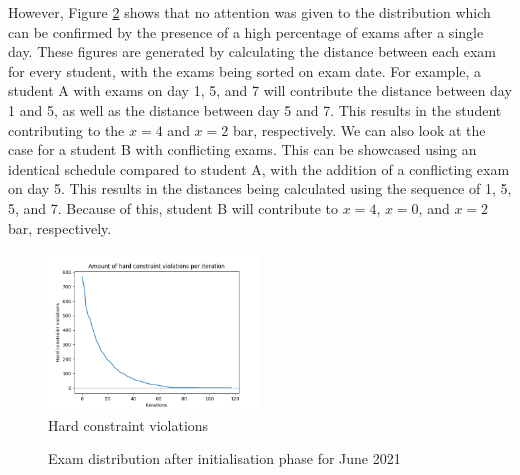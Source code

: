 However, Figure \ref{fig:init} shows that no attention was given to the distribution which can be confirmed by the presence of a high percentage of exams after a single day. These figures are generated by calculating the distance between each exam for every student, with the exams being sorted on exam date. For example, a student A with exams on day 1, 5, and 7 will contribute the distance between day 1 and 5, as well as the distance between day 5 and 7. This results in the student contributing to the $x = 4$ and $x = 2$ bar, respectively. We can also look at the case for a student B with conflicting exams. This can be showcased using an identical schedule compared to student A, with the addition of a conflicting exam on day 5. This results in the distances being calculated using the sequence of 1, 5, 5, and 7. Because of this, student B will contribute to $x = 4$, $x = 0$, and $x = 2$ bar, respectively.

\begin{figure}[H]
	\centering
	\includegraphics[width=0.5\textwidth]{images/init/conflicts.png} 
	\caption{Hard constraint violations}
	\label{fig:violations}
\end{figure}
\begin{figure}[H]
  \centering
  \hfill
  \caption{Exam distribution after initialisation phase for June 2021}
  \label{fig:init}
\end{figure}

